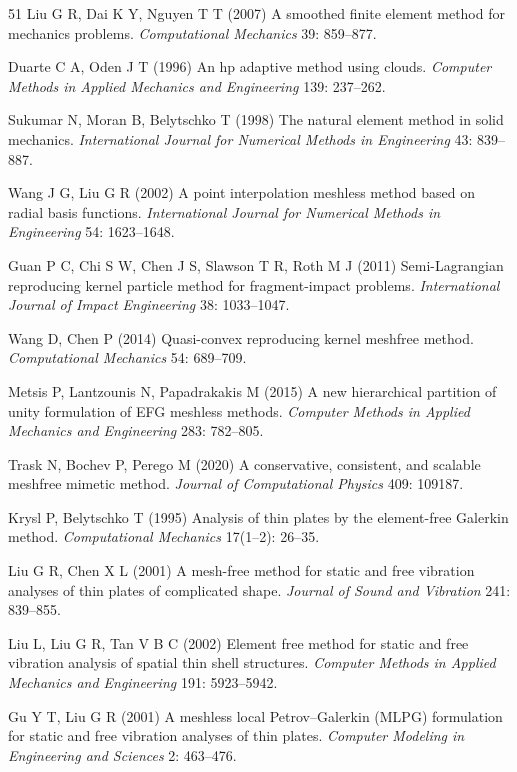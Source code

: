 \begin{thebibliography}{51}
 Liu G R, Dai K Y, Nguyen T T (2007) A smoothed finite element method for mechanics problems. \emph{Computational Mechanics} 39: 859--877.

 Duarte C A, Oden J T (1996) An hp adaptive method using clouds. \emph{Computer Methods in Applied Mechanics and Engineering} 139: 237--262.

 Sukumar N, Moran B, Belytschko T (1998) The natural element method in solid mechanics. \emph{International Journal for Numerical Methods in Engineering} 43: 839--887.

 Wang J G, Liu G R (2002) A point interpolation meshless method based on radial basis functions. \emph{International Journal for Numerical Methods in Engineering} 54: 1623--1648.

 Guan P C, Chi S W, Chen J S, Slawson T R, Roth M J (2011) Semi-{Lagrangian} reproducing kernel particle method for fragment-impact problems. \emph{International Journal of Impact Engineering} 38: 1033--1047.

 Wang D, Chen P (2014) Quasi-convex reproducing kernel meshfree method. \emph{Computational Mechanics} 54: 689--709.

 Metsis P, Lantzounis N, Papadrakakis M (2015) A new hierarchical partition of unity formulation of {EFG} meshless methods. \emph{Computer Methods in Applied Mechanics and Engineering} 283: 782--805.

 Trask N, Bochev P, Perego M (2020) A conservative, consistent, and scalable meshfree mimetic method. \emph{Journal of Computational Physics} 409: 109187.

 Krysl P, Belytschko T (1995) Analysis of thin plates by the element-free {Galerkin} method. \emph{Computational Mechanics} 17(1--2): 26--35.

 Liu G R, Chen X L (2001) A mesh-free method for static and free vibration analyses of thin plates of complicated shape. \emph{Journal of Sound and Vibration} 241: 839--855.

 Liu L, Liu G R, Tan V B C (2002) Element free method for static and free vibration analysis of spatial thin shell structures. \emph{Computer Methods in Applied Mechanics and Engineering} 191: 5923--5942.

 Gu Y T, Liu G R (2001) A meshless local {Petrov--Galerkin} ({MLPG}) formulation for static and free vibration analyses of thin plates. \emph{Computer Modeling in Engineering and Sciences} 2: 463--476.


\end{thebibliography}
